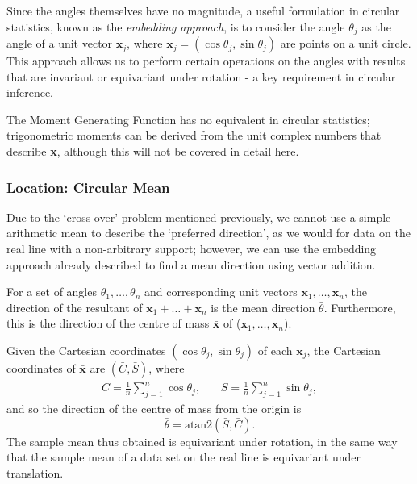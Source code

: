 \documentclass[../../ArchStats.tex]{subfiles}
\begin{document}
Since the angles themselves have no magnitude, a useful formulation in circular statistics, known as the \textit{embedding approach}, is to consider the angle $\theta_j$ as the angle of a unit vector $\mathbf{x}_j$, where $\mathbf{x}_j = (\cos\theta_j, \sin\theta_j)$ are points on a unit circle. This approach allows us to perform certain operations on the angles with results that are invariant or equivariant under rotation - a key requirement in circular inference.

The Moment Generating Function has no equivalent in circular statistics; trigonometric moments can be derived from the unit complex numbers that describe \textbf{x}, although this will not be covered in detail here.

\subsubsection{Location: Circular Mean}
\label{sec:circ-mean}

Due to the `cross-over' problem mentioned previously, we cannot use a simple arithmetic mean to describe the `preferred direction', as we would for data on the real line with a non-arbitrary support; however, we can use the embedding approach already described to find a mean direction using vector addition.

For a set of angles $\theta_1, \dots, \theta_n$ and corresponding unit vectors $\mathbf{x}_1, \dots, \mathbf{x}_n$, the direction of the resultant of $\mathbf{x}_1 + \dots + \mathbf{x}_n$ is the mean direction $\bar{\theta}$. Furthermore, this is the direction of the centre of mass $\mathbf{\bar{x}}$ of ($\mathbf{x}_1, \dots, \mathbf{x}_n$).

Given the Cartesian coordinates $(\cos\theta_j, \sin\theta_j)$ of each $\mathbf{x}_j$, the Cartesian coordinates of $\mathbf{\bar{x}}$ are $(\bar{C}, \bar{S})$, where
	\begin{equation}
	\label{eqn:C-and-S}
	\begin{matrix*}
	\displaystyle{\bar{C} = \frac{1}{n} \sum_{j=1}^{n} \cos \theta_j}, & \, & 
	\displaystyle{\bar{S} = \frac{1}{n} \sum_{j=1}^{n} \sin \theta_j},
	\end{matrix*}
	\end{equation}
and so the direction of the centre of mass from the origin is
	\begin{equation}
	\label{eqn:circ-mean}
	\bar{\theta} = \text{atan2}(\bar{S},\bar{C}).
	\end{equation}
The sample mean thus obtained is equivariant under rotation, in the same way that the sample mean of a data set on the real line is equivariant under translation.
\end{document}
